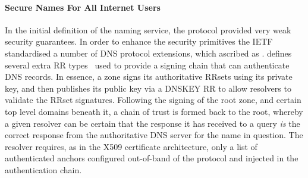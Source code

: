 % 
% 

\paragraph{Secure Names For All Internet Users}

In the initial definition of the naming service, the protocol provided very weak
security guarantees. In order to enhance the security primitives the IETF
standardised a number of DNS protocol extensions, which ascribed as \dnssec.
\dnssec defines several extra RR types~\cite{RFC4034} used to provide a signing
chain that can authenticate DNS records.  In essence, a zone signs its
authoritative RRsets using its private key, and then publishes its public key
via a DNSKEY RR to allow resolvers to validate the RRset signatures. Following
the signing of the root zone, and certain top level domains beneath it, a chain
of trust is formed back to the root, whereby a given resolver can be certain
that the response it has received to a query \emph{is} the correct response from
the authoritative DNS server for the name in question. The resolver requires, as
in the X509 certificate architecture, only a list of authenticated anchors
configured out-of-band of the protocol and injected in the authentication chain.

